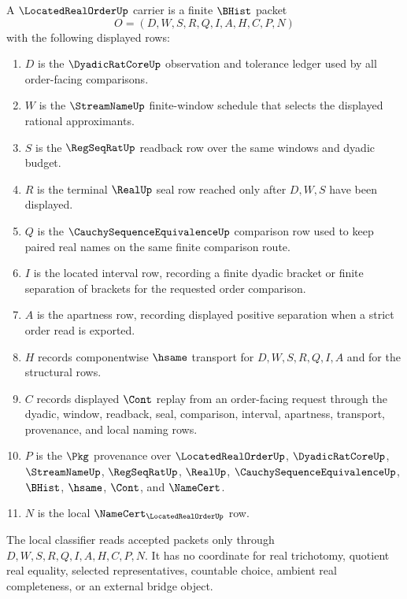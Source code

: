 \begin{definition}
\label{def:located-real-order-carrier}
A $\LocatedRealOrderUp$ carrier is a finite $\BHist$ packet
$$
O=(D,W,S,R,Q,I,A,H,C,P,N)
$$
with the following displayed rows:
\begin{enumerate}
\item $D$ is the $\DyadicRatCoreUp$ observation and tolerance ledger used by all order-facing comparisons.
\item $W$ is the $\StreamNameUp$ finite-window schedule that selects the displayed rational approximants.
\item $S$ is the $\RegSeqRatUp$ readback row over the same windows and dyadic budget.
\item $R$ is the terminal $\RealUp$ seal row reached only after $D,W,S$ have been displayed.
\item $Q$ is the $\CauchySequenceEquivalenceUp$ comparison row used to keep paired real names on the same finite comparison route.
\item $I$ is the located interval row, recording a finite dyadic bracket or finite separation of brackets for the requested order comparison.
\item $A$ is the apartness row, recording displayed positive separation when a strict order read is exported.
\item $H$ records componentwise $\hsame$ transport for $D,W,S,R,Q,I,A$ and for the structural rows.
\item $C$ records displayed $\Cont$ replay from an order-facing request through the dyadic, window, readback, seal, comparison, interval, apartness, transport, provenance, and local naming rows.
\item $P$ is the $\Pkg$ provenance over $\LocatedRealOrderUp$, $\DyadicRatCoreUp$, $\StreamNameUp$, $\RegSeqRatUp$, $\RealUp$, $\CauchySequenceEquivalenceUp$, $\BHist$, $\hsame$, $\Cont$, and $\NameCert$.
\item $N$ is the local $\NameCert_{\LocatedRealOrderUp}$ row.
\end{enumerate}
The local classifier reads accepted packets only through $D,W,S,R,Q,I,A,H,C,P,N$. It has no coordinate for real trichotomy, quotient real equality, selected representatives, countable choice, ambient real completeness, or an external bridge object.
\end{definition}

